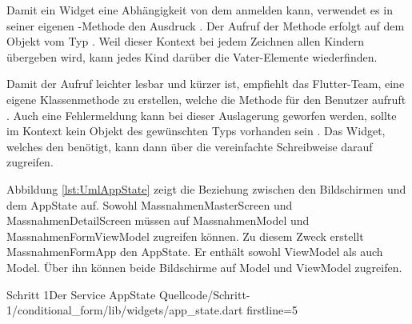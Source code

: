 Damit ein Widget eine Abhängigkeit von dem  anmelden kann, verwendet es in seiner eigenen -Methode den Ausdruck .
Der Aufruf der Methode erfolgt auf dem Objekt vom Typ .
Weil dieser Kontext bei jedem Zeichnen allen Kindern übergeben wird, kann jedes Kind darüber die Vater-Elemente wiederfinden.

Damit der Aufruf leichter lesbar und kürzer ist, empfiehlt das Flutter-Team, eine eigene Klassenmethode zu erstellen, welche die Methode für den Benutzer aufruft .
Auch eine Fehlermeldung kann bei dieser Auslagerung geworfen werden, sollte im Kontext kein Objekt des gewünschten Typs vorhanden sein .
Das Widget, welches den  benötigt, kann dann über die vereinfachte Schreibweise  darauf zugreifen.

Abbildung \ref{lst:UmlAppState} zeigt die Beziehung zwischen den Bildschirmen und dem AppState auf.
Sowohl MassnahmenMasterScreen und MassnahmenDetailScreen müssen auf MassnahmenModel und MassnahmenFormViewModel zugreifen können.
Zu diesem Zweck erstellt MassnahmenFormApp den AppState.
Er enthält sowohl ViewModel als auch Model.
Über ihn können beide Bildschirme auf Model und ViewModel zugreifen.



\begin{alexlisting}{Schritt 1}{Der Service AppState}
  {Quellcode/Schritt-1/conditional_form/lib/widgets/app_state.dart}
  {firstline=5}
  \label{lst:Schritt1DerServiceAppState}
\end{alexlisting}


